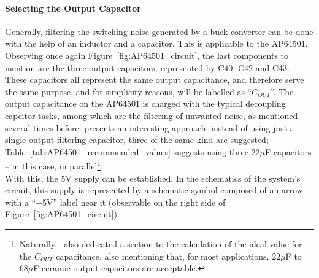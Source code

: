 \paragraph{Selecting the Output Capacitor}	Generally, filtering the switching noise generated by a buck converter can be done with the help of an inductor and a capacitor.
This is applicable to the AP64501.
Observing once again Figure~\ref{fig:AP64501_circuit}, the last components to mention are the three output capacitors, represented by C40, C42 and C43. These capacitors all represent the same output capacitance, and therefore serve the same purpose, and for simplicity reasons, will be labelled as ``$C_{OUT}$''. The output capacitance on the AP64501 is charged with the typical decoupling capcitor tasks, among which are the filtering of unwanted noise, as mentioned several times before.
\cite{AP64501} presents an interesting approach: instead of using just a single output filtering capacitor, three of the same kind are suggested; Table~\ref{tab:AP64501_recommended_values} suggests using three $22 \mu$F capacitors -- in this case, in parallel\footnote[12]{Naturally,~\cite{AP64501} also dedicated a section to the calculation of the ideal value for the $C_{OUT}$ capacitance, also mentioning that, for most applications, $22 \mu$F to $68 \mu$F ceramic output capacitors are acceptable.}.\\

With this, the 5V supply can be established. In the schematics of the system's circuit, this supply is represented by a schematic symbol composed of an arrow with a ``+5V'' label near it (observable on the right side of Figure~\ref{fig:AP64501_circuit}).





